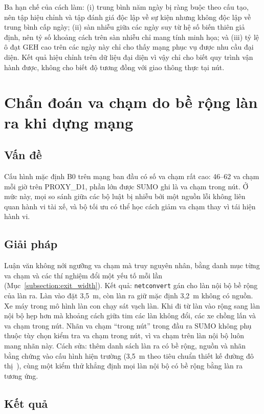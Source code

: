 \documentclass[../main.tex]{subfiles}
\begin{document}
Ba hạn chế của cách làm: (i) trung bình năm ngày bị ràng buộc theo cấu tạo, nên tập hiệu chỉnh và tập đánh giá độc lập về sự kiện nhưng không độc lập về trung bình cấp ngày; (ii) sàn nhiễu giữa các ngày suy từ hệ số biến thiên giả định, nên tỷ số khoảng cách trên sàn nhiễu chỉ mang tính minh họa; và (iii) tỷ lệ ô đạt GEH cao trên các ngày này chỉ cho thấy mạng phục vụ được nhu cầu đại diện.
Kết quả hiệu chỉnh trên dữ liệu đại diện vì vậy chỉ cho biết quy trình vận hành được, không cho biết độ tương đồng với giao thông thực tại nút.

\section{Chẩn đoán va chạm do bề rộng làn ra khi dựng mạng}
\label{section:5.5}

\subsection{Vấn đề}

Cấu hình mặc định B0 trên mạng ban đầu có số va chạm rất cao: 46--62 va chạm mỗi giờ trên PROXY\_D1, phần lớn được SUMO ghi là va chạm trong nút. Ở mức này, mọi so sánh giữa các bộ luật bị nhiễu bởi một nguồn lỗi không liên quan hành vi tài xế, và bộ tối ưu có thể học cách giảm va chạm thay vì tái hiện hành vi.

\subsection{Giải pháp}

Luận văn không nới ngưỡng va chạm mà truy nguyên nhân, bằng danh mục từng va chạm và các thí nghiệm đổi một yếu tố mỗi lần (Mục~\ref{subsection:exit_width}). Kết quả: \texttt{netconvert} gán cho làn nội bộ bề rộng của làn ra. Làn vào đặt 3,5~m, còn làn ra giữ mặc định 3,2~m không có nguồn. Xe máy trong mô hình làn con chạy sát vạch làn. Khi đi từ làn vào rộng sang làn nội bộ hẹp hơn mà khoảng cách giữa tim các làn không đổi, các xe chồng lấn và va chạm trong nút. Nhãn va chạm ``trong nút'' trong đầu ra SUMO không phụ thuộc tùy chọn kiểm tra va chạm trong nút, vì va chạm trên làn nội bộ luôn mang nhãn này.
Cách sửa: thêm danh sách làn ra có bề rộng, nguồn và nhãn bằng chứng vào cấu hình hiện trường (3,5~m theo tiêu chuẩn thiết kế đường đô thị~\cite{tcvn13592}), cùng một kiểm thử khẳng định mọi làn nội bộ có bề rộng bằng làn ra tương ứng.

\subsection{Kết quả}
\end{document}
